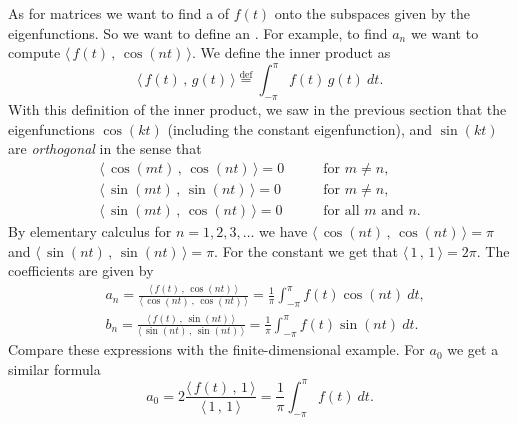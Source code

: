 As for matrices we want to find a \emph{}
of $f(t)$ onto the subspaces given by the eigenfunctions.  So we want to
define an \emph{}.  For example, to
find $a_n$ we want to compute $\langle \, f(t) \, , \, \cos (nt) \, \rangle$.
We define the inner product as
\begin{equation*}
\langle \, f(t)\, , \, g(t) \, \rangle \overset{\text{def}}{=}
\int_{-\pi}^\pi f(t) \, g(t) ~ dt .
\end{equation*}
With this definition of the inner product,
we saw in the previous section that the eigenfunctions $\cos (kt)$
(including the constant eigenfunction), and
$\sin (kt)$ are \emph{orthogonal} in the sense
that
\begin{align*}
\langle \, \cos (mt)\, , \, \cos (nt) \, \rangle = 0 & \qquad \text{for } m \not= n , \\
\langle \, \sin (mt)\, , \, \sin (nt) \, \rangle = 0 & \qquad \text{for } m \not= n , \\
\langle \, \sin (mt)\, , \, \cos (nt) \, \rangle = 0 & \qquad \text{for all } m \text{ and } n .
\end{align*}
By elementary calculus for $n=1,2,3,\ldots$
we have $\langle \, \cos (nt) \, , \, \cos (nt) \, \rangle = \pi$
and $\langle \, \sin (nt) \, , \, \sin (nt) \, \rangle = \pi$.  For the constant we get
that $\langle \, 1 \, , \, 1 \, \rangle = 2\pi$.
The coefficients are given by
\begin{equation*}
\boxed{~~
\begin{aligned}
& a_n =
\frac{\langle \, f(t) \, , \, \cos (nt) \, \rangle}{\langle \, \cos (nt) \, , \,
\cos (nt) \, \rangle}
= 
\frac{1}{\pi} \int_{-\pi}^\pi f(t) \cos (nt) ~ dt , \\
& b_n =
\frac{\langle \, f(t) \, , \, \sin (nt) \, \rangle}{\langle \, \sin (nt) \, , \,
\sin (nt) \, \rangle}
= 
\frac{1}{\pi} \int_{-\pi}^\pi f(t) \sin (nt) ~ dt .
\end{aligned}
~~}
\end{equation*}
Compare these expressions with the finite-dimensional example.
For $a_0$ we get a similar formula
\begin{equation*}
\boxed{~~
a_0 = 2
\frac{\langle \, f(t) \, , \, 1 \, \rangle}{\langle \, 1 \, , \,
1 \, \rangle}
=
\frac{1}{\pi} \int_{-\pi}^\pi f(t) ~ dt .
~~}
\end{equation*}

